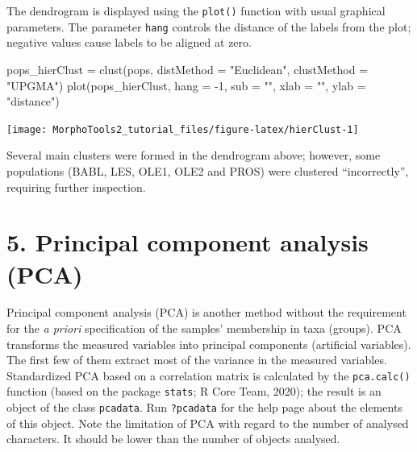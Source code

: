 \documentclass[
  11pt,
  a4paper]{article}
\newenvironment{Shaded}{\begin{snugshade}}{\end{snugshade}}
\newcommand{\AttributeTok}[1]{\textcolor[rgb]{0.77,0.63,0.00}{#1}}
\newcommand{\DecValTok}[1]{\textcolor[rgb]{0.00,0.00,0.81}{#1}}
\newcommand{\FunctionTok}[1]{\textcolor[rgb]{0.00,0.00,0.00}{#1}}
\newcommand{\NormalTok}[1]{#1}
\newcommand{\OtherTok}[1]{\textcolor[rgb]{0.56,0.35,0.01}{#1}}
\newcommand{\SpecialCharTok}[1]{\textcolor[rgb]{0.00,0.00,0.00}{#1}}
\newcommand{\StringTok}[1]{\textcolor[rgb]{0.31,0.60,0.02}{#1}}
\begin{document}
The dendrogram is displayed using the \texttt{plot()} function with
usual graphical parameters. The parameter \texttt{hang} controls the
distance of the labels from the plot; negative values cause labels to be
aligned at zero.

\begin{Shaded}
\begin{Highlighting}[]
\NormalTok{pops\_hierClust }\OtherTok{=} \FunctionTok{clust}\NormalTok{(pops, }\AttributeTok{distMethod =} \StringTok{"Euclidean"}\NormalTok{, }\AttributeTok{clustMethod =} \StringTok{"UPGMA"}\NormalTok{)}
\FunctionTok{plot}\NormalTok{(pops\_hierClust, }\AttributeTok{hang =} \SpecialCharTok{{-}}\DecValTok{1}\NormalTok{, }\AttributeTok{sub =} \StringTok{""}\NormalTok{, }\AttributeTok{xlab =} \StringTok{""}\NormalTok{, }\AttributeTok{ylab =} \StringTok{"distance"}\NormalTok{)}
\end{Highlighting}
\end{Shaded}

\begin{center}\texttt{[image: MorphoTools2\_tutorial\_files/figure-latex/hierClust-1]} \end{center}

Several main clusters were formed in the dendrogram above; however, some
populations (BABL, LES, OLE1, OLE2 and PROS) were clustered
``incorrectly'', requiring further inspection.

\newpage

\hypertarget{principal-component-analysis-pca}{%
\section{5. Principal component analysis
(PCA)}\label{principal-component-analysis-pca}}

Principal component analysis (PCA) is another method without the
requirement for the \emph{a priori} specification of the samples'
membership in taxa (groups). PCA transforms the measured variables into
principal components (artificial variables). The first few of them
extract most of the variance in the measured variables. Standardized PCA
based on a correlation matrix is calculated by the \texttt{pca.calc()}
function (based on the package \texttt{stats}; R Core Team, 2020); the
result is an object of the class \texttt{pcadata}. Run \texttt{?pcadata}
for the help page about the elements of this object. Note the limitation
of PCA with regard to the number of analysed characters. It should be
lower than the number of objects analysed.
\end{document}
